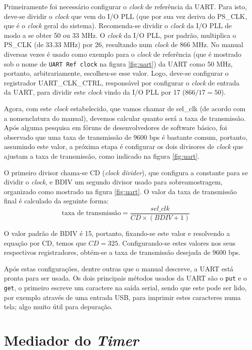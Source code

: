 Primeiramente foi necessário configurar o \emph{clock} de referência da UART. Para isto, deve-se dividir o \emph{clock} que vem do I/O PLL (que por sua vez deriva do PS\_CLK, que é o \emph{clock} geral do sistema). Recomenda-se dividir o \emph{clock} da I/O PLL de modo a se obter 50 ou 33 MHz.
O \emph{clock} da I/O PLL, por padrão, multiplica o PS\_CLK (de 33.33 MHz) por 26, resultando num \emph{clock} de 866 MHz.
No manual diversas vezes é usado como exemplo para o \emph{clock} de referência (que é mostrado sob o nome de \verb+UART Ref clock+ na figura \ref{fig:uart}) da UART como 50 MHz, portanto, arbitrariamente, escolheu-se esse valor. Logo, deve-se configurar o registrador UART\_CLK\_CTRL, responsável por configurar o \emph{clock} de entrada da UART, para dividir este \emph{clock} vindo da I/O PLL por 17 ($866/17 = 50$).

Agora, com este \emph{clock} estabelecido, que vamos chamar de sel\_clk (de acordo com a nomenclatura do manual), devemos calcular quanto será a taxa de transmissão.
Após alguma pesquisa em fóruns de desenvolvedores de software básico, foi observado que uma taxa de transmissão de 9600 bps é bastante comum, portanto, assumindo este valor, a próxima etapa é configurar os dois divisores de \emph{clock} que ajustam a taxa de transmissão, como indicado na figura \ref{fig:uart}.

O primeiro divisor chama-se CD (\emph{clock divider}), que configura a constante para se dividir o \emph{clock}, e BDIV um segundo divisor usado para sobreamostragem, organizado como mostrado na figura \ref{fig:uart}. O valor da taxa de transmissão final é calculado da seguinte forma:
\begin{equation}
	\text{taxa de transmissão} = \frac{sel\_clk}{CD \times (BDIV+1)}
\end{equation}

O valor padrão de BDIV é 15, portanto, fixando-se este valor e resolvendo a equação por CD, temos que $CD = 325$. Configurando-se estes valores nos seus respectivos registradores, obtém-se a taxa de transmissão desejada de 9600 bps.

Após estas configurações, dentre outras que o manual descreve, a UART está pronta para ser usada. Os dois principais métodos usados da UART são o \verb+put+ e o \verb+get+, o primeiro escreve um caractere na saída serial, sendo que este pode ser lido, por exemplo através de uma entrada USB, para imprimir estes caracteres numa tela; algo muito útil para depuração.


\section{Mediador do \emph{Timer}}

